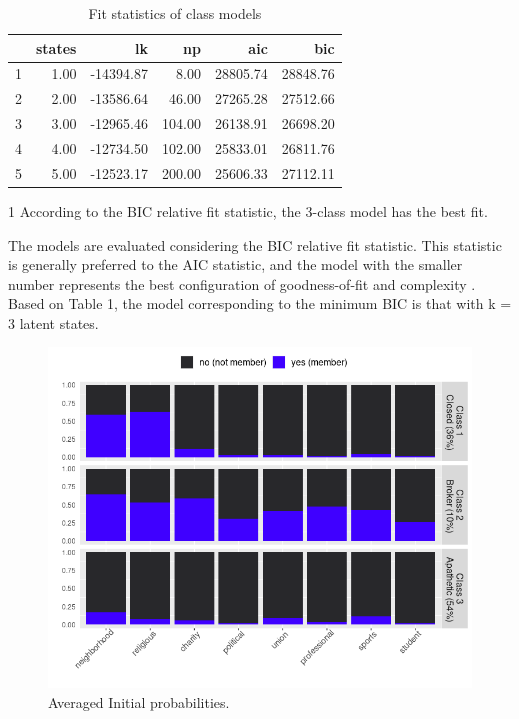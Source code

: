 \begin{table}[H]
\centering
\begin{threeparttable}
\caption{\label{demo-table} Fit statistics of class models}
\begin{tabular}{rrrrrr}
  \hline
 & states & lk & np & aic & bic \\ 
  \hline
1 & 1.00 & -14394.87 & 8.00 & 28805.74 & 28848.76 \\ 
  2 & 2.00 & -13586.64 & 46.00 & 27265.28 & 27512.66 \\ 
  3 & 3.00 & -12965.46 & 104.00 & 26138.91 & 26698.20 \\ 
  4 & 4.00 & -12734.50 & 102.00 & 25833.01 & 26811.76 \\ 
  5 & 5.00 & -12523.17 & 200.00 & 25606.33 & 27112.11 \\ 
   \hline
\end{tabular}
\begin{tablenotes}
    \item[1] According to the BIC relative fit statistic, the 3-class model has the best fit.
  \end{tablenotes}
\end{threeparttable}
\end{table}

The models are evaluated considering the BIC relative fit statistic. This statistic is generally preferred to the AIC statistic, and the model with the smaller number represents the best configuration of goodness-of-fit and complexity \parencite{bartolucci_latent_2015}. Based on Table 1, the model corresponding to the minimum BIC is that with k = 3 latent states. 

\begin{figure}[H]
    \centering
    \includegraphics[width=12cm]{output/plot_latentclass2.png}
    \caption{Averaged Initial probabilities.}
    \label{fig:}
\end{figure}


